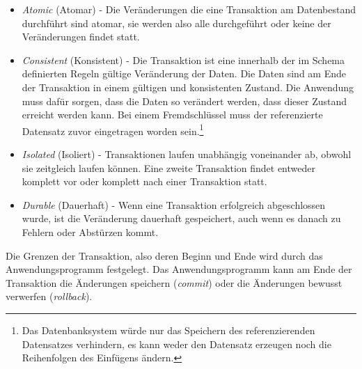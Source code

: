 \begin{itemize}
	\item \emph{Atomic} (Atomar) - Die Veränderungen die eine Transaktion am Datenbestand durchführt sind atomar, sie werden also alle durchgeführt oder keine der Veränderungen findet statt.
	\item \emph{Consistent} (Konsistent) - Die Transaktion ist eine innerhalb der im Schema definierten Regeln gültige Veränderung der Daten. Die Daten sind am Ende der Transaktion in einem gültigen und konsistenten Zustand. Die Anwendung muss dafür sorgen, dass die Daten so verändert werden, dass dieser Zustand erreicht werden kann. Bei einem Fremdschlüssel muss der referenzierte Datensatz zuvor eingetragen worden sein.\footnote{Das Datenbanksystem würde nur das Speichern des referenzierenden Datensatzes verhindern, es kann weder den Datensatz erzeugen noch die Reihenfolgen des Einfügens ändern.}
	\item \emph{Isolated} (Isoliert) - Transaktionen laufen unabhängig voneinander ab, obwohl sie zeitgleich laufen können. Eine zweite Transaktion findet entweder komplett vor oder komplett nach einer Transaktion statt.
	\item \emph{Durable} (Dauerhaft) - Wenn eine Transaktion erfolgreich abgeschlossen wurde, ist die Veränderung dauerhaft gespeichert, auch wenn es danach zu Fehlern oder Abstürzen kommt.
\end{itemize}
Die Grenzen der Transaktion, also deren Beginn und Ende wird durch das Anwendungsprogramm festgelegt. Das Anwendungsprogramm kann am Ende der Transaktion die Änderungen speichern (\emph{commit}) oder die Änderungen bewusst verwerfen (\emph{rollback}).
